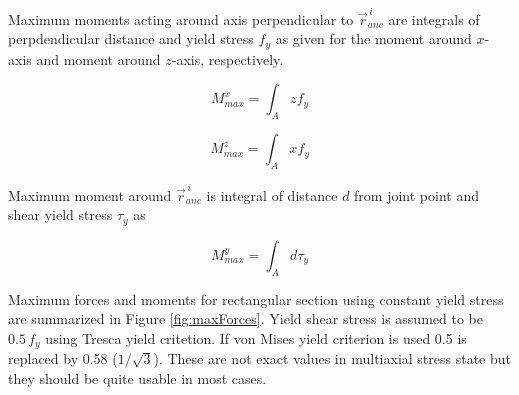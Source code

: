 Maximum moments acting around axis perpendicular to $\vec{r}_{anc}^{\,i} $
are integrals of perpdendicular distance 
and yield stress $f_y$ as given for the moment around $x$-axis 
and moment around $z$-axis, respectively.

\begin{equation} \label{eq:Mx}
M_{max}^x= \int_A z f_y
\end{equation}

\begin{equation} \label{eq:Mz}
M_{max}^z= \int_A x f_y
\end{equation}

Maximum moment around $\vec{r}_{anc}^{\,i} $
is integral of distance $d$ from joint point
and shear yield stress $\tau_y$ as 

\begin{equation} \label{eq:My}
M_{max}^y= \int_A d \tau_y
\end{equation}

Maximum forces and moments for 
rectangular section using constant yield stress
are summarized in Figure \ref{fig:maxForces}.
Yield shear stress is assumed to be $ 0.5\, f_y$ using Tresca yield critetion.
If von Mises yield criterion is used 0.5 is replaced by 0.58 ($1/\sqrt{3}$).
These are not exact values in multiaxial stress state but they
should be quite usable in most cases.



